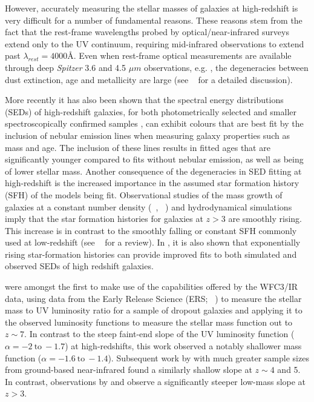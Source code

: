 However, accurately measuring the stellar masses of galaxies at high-redshift is very difficult for a number of fundamental reasons. These reasons stem from the fact that the rest-frame wavelengths probed by optical/near-infrared surveys extend only to the UV continuum, requiring mid-infrared observations to extend past $\lambda_{rest} = 4000$\AA. Even when rest-frame optical measurements are available through deep \emph{Spitzer} 3.6 and 4.5 $\mu m$ observations, e.g.  \citet{2009ApJ...697.1493S,Labbe:2010ho,Gonzalez:2011dn,Yan:2012ky}, the degeneracies between dust extinction, age and metallicity are large (see \citeauthor{2013ASSL..396..223D}~\citeyear{2013ASSL..396..223D} for a detailed discussion).

More recently it has also been shown that the spectral energy distributions (SEDs) of high-redshift galaxies, for both photometrically selected \citep{2009A&A...502..423S,2010A&A...515A..73S,Ono:2010ed,2011MNRAS.418.2074M,Lorenzoni:2011iz,2012ApJ...755..148G} and smaller spectroscopically confirmed samples \citep{Shim:2011cw,2013MNRAS.429..302C,Stark:2013ix}, can exhibit colours that are best fit by the inclusion of nebular emission lines when measuring galaxy properties such as mass and age. The inclusion of these lines results in fitted ages that are significantly younger compared to fits without nebular emission, as well as being of lower stellar mass. Another consequence of the degeneracies in SED fitting at high-redshift is the increased importance in the assumed star formation history (SFH) of the models being fit. Observational studies of the mass growth of galaxies at a constant number density (\citeauthor{2011MNRAS.412.1123P}~\citeyear{2011MNRAS.412.1123P}, \citeauthor{2015ApJ...799..183S}~\citeyear{2015ApJ...799..183S}) and hydrodynamical simulations \citep{2011MNRAS.410.1703F} imply that the star formation histories for galaxies at $z > 3$ are smoothly rising. This increase is in contrast to the smoothly falling or constant SFH commonly used at low-redshift (see \citeauthor{Conroy:2013dk}~\citeyear{Conroy:2013dk} for a review). In \citet{Maraston:2010dl}, it is also shown that exponentially rising star-formation histories can provide improved fits to both simulated and observed SEDs of high redshift galaxies.

\citet{Gonzalez:2011dn} were amongst the first to make use of the capabilities offered by the WFC3/IR data, using data from the Early Release Science (ERS; \citeauthor{2011ApJS..193...27W}~\citeyear{2011ApJS..193...27W}) to measure the stellar mass to UV luminosity ratio for a sample of dropout galaxies and applying it to the observed luminosity functions to measure the stellar mass function out to $z \sim 7$. In contrast to the steep faint-end slope of the UV luminosity function ($\alpha = -2~\text{to}~-1.7$) at high-redshifts, this work observed a notably shallower mass function ($\alpha = -1.6 ~\text{to}~-1.4$). Subsequent work by \citet{2012ApJ...752...66L} with much greater sample sizes from ground-based near-infrared found a similarly shallow slope at $z \sim 4$ and 5. In contrast, observations by \citet{2011MNRAS.413..162C} and \citet{Santini:2012jq} observe a significantly steeper low-mass slope at $z > 3$.
 
